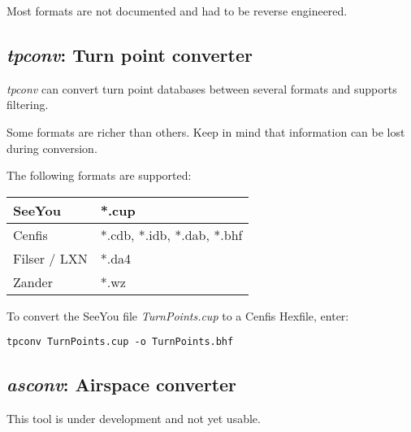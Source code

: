 \documentclass{article}
\begin{document}
Most formats are not documented and had to be reverse engineered.


\subsection{{\em tpconv}: Turn point converter}

{\em tpconv} can convert turn point databases between several formats
and supports filtering.

Some formats are richer than others.  Keep in mind that information
can be lost during conversion.

The following formats are supported:

\begin{tabular}{|l|l|}
\hline
SeeYou & *.cup \\
\hline
Cenfis & *.cdb, *.idb, *.dab, *.bhf \\
\hline
Filser / LXN & *.da4 \\
\hline
Zander & *.wz \\
\hline
\end{tabular}

To convert the SeeYou file {\em TurnPoints.cup} to a Cenfis Hexfile,
enter:

\begin{verbatim}
tpconv TurnPoints.cup -o TurnPoints.bhf 
\end{verbatim}


\subsection{{\em asconv}: Airspace converter}

This tool is under development and not yet usable.
\end{document}

